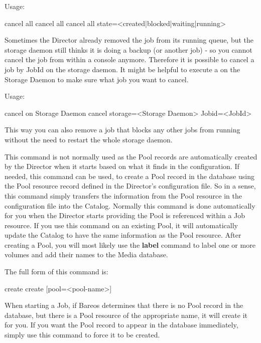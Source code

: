 \begin{description}
   Usage:
\begin{bconsole}{cancel all}
cancel all
cancel all state=<created|blocked|waiting|running>
\end{bconsole}

   Sometimes the Director already removed the job from its running queue, but the storage daemon still thinks it is doing a backup (or another job) - so you cannot cancel the job from within a console anymore. Therefore it is possible to cancel a job by JobId on the storage daemon. It might be helpful to execute a  on the Storage Daemon to make sure what job you want to cancel.

   Usage:
\begin{bconsole}{cancel on Storage Daemon}
cancel storage=<Storage Daemon> Jobid=<JobId>
\end{bconsole}

   This way you can also remove a job that blocks any other jobs from running without the need to restart the whole storage daemon.

\item [create]
   This command is not normally used as the Pool records are automatically
   created by the Director when it starts based on what it finds in
   the configuration.  If needed, this command can be used,
   to create a Pool record in the database using the
   Pool resource record defined in the Director's configuration file.  So
   in a sense, this command simply transfers the information from the Pool
   resource in the configuration file into the Catalog.  Normally this
   command is done automatically for you when the Director starts providing
   the Pool is referenced within a Job resource.  If you use this command
   on an existing Pool, it will automatically update the Catalog to have
   the same information as the Pool resource.  After creating a Pool, you
   will most likely use the {\bf label} command to label one or more
   volumes and add their names to the Media database.

   The full form of this command is:

\begin{bconsole}{create}
create [pool=<pool-name>]
\end{bconsole}

   When starting a Job, if Bareos determines that there is no Pool record
   in the database, but there is a Pool resource of the appropriate name,
   it will create it for you.  If you want the Pool record to appear in the
   database immediately, simply use this command to force it to be created.


\end{description}
